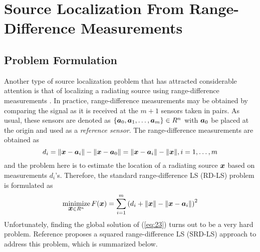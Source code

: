 \section{Source Localization From Range-Difference Measurements}%
\subsection{Problem Formulation} %

Another type of source localization problem that has attracted considerable attention is that of localizing a radiating source using range-difference measurements \cite{ StLi, BeckStLi}. In practice, range-difference measurements may be
obtained by comparing the signal as it is received at the $m+1$ sensors taken in pairs. As usual, these sensors are denoted as $\{\mbox{\boldmath$a$}_0, \mbox{\boldmath$a$}_1,\ldots,\mbox{\boldmath$a$}_m\} \in R^n$ with $\mbox{\boldmath$a$}_0$ be placed at the origin and used as a \textit{reference sensor}.  The range-difference measurements are obtained as
 \begin{equation} \label{eq:22}
 d_i=\|\mbox{\boldmath$x$}-\mbox{\boldmath$a$}_i\|-\|\mbox{\boldmath$x$}-\mbox{\boldmath$a$}_0\|=\|\mbox{\boldmath$x$}-\mbox{\boldmath$a$}_i\|-\|\mbox{\boldmath$x$}\|, i = 1,\ldots,m
 \end{equation}
and the problem here is to estimate the location of a radiating source $\mbox{\boldmath$x$}$ based on measurements $d_i$'s. Therefore, the standard range-difference LS (RD-LS) problem is formulated as
 \begin{equation} \label{eq:23}
\mathop{\mbox{minimize}}_{\mbox{\boldmath$x$} \in R^n} F(\mbox{\boldmath$x$})=\sum_{i=1}^m \left(d_i+\|\mbox{\boldmath$x$}\|-\|\mbox{\boldmath$x$}-\mbox{\boldmath$a$}_i\|\right)^2
 \end{equation}
 Unfortunately, finding the global solution of (\ref{eq:23}) turns out to be a very hard problem. Reference \cite{BeckStLi} proposes a squared range-difference LS (SRD-LS) approach to address this problem, which is summarized below.

